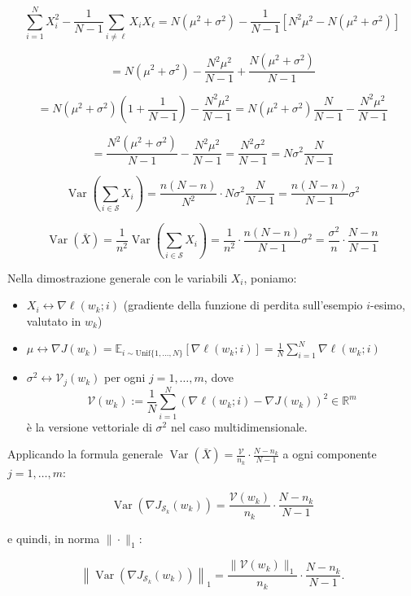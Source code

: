 \documentclass[a4paper,12pt]{article}
\numberwithin{equation}{section}
\numberwithin{figure}{section}
\numberwithin{table}{section}
\begin{document}
\[
\sum_{i=1}^N X_i^2 - \frac{1}{N-1} \sum_{i \neq \ell} X_i X_\ell
= N(\mu^2+\sigma^2) - \frac{1}{N-1}\left[N^2\mu^2 - N(\mu^2+\sigma^2)\right]
\]

\[
= N(\mu^2+\sigma^2) - \frac{N^2\mu^2}{N-1} + \frac{N(\mu^2+\sigma^2)}{N-1}
\]

\[
= N(\mu^2+\sigma^2)\left(1 + \frac{1}{N-1}\right) - \frac{N^2\mu^2}{N-1}
= N(\mu^2+\sigma^2)\frac{N}{N-1} - \frac{N^2\mu^2}{N-1}
\]

\[
= \frac{N^2(\mu^2+\sigma^2)}{N-1} - \frac{N^2\mu^2}{N-1}
= \frac{N^2\sigma^2}{N-1}
= N\sigma^2 \frac{N}{N-1}
\]

\[
\operatorname{Var}\left(\sum_{i \in \mathcal{S}} X_i\right) = 
\frac{n(N-n)}{N^2} \cdot N\sigma^2 \frac{N}{N-1}
= \frac{n(N-n)}{N-1} \sigma^2
\]

\[
\operatorname{Var}(\bar{X}) = \frac{1}{n^2} \operatorname{Var}\left(\sum_{i \in \mathcal{S}} X_i\right) 
= \frac{1}{n^2} \cdot \frac{n(N-n)}{N-1} \sigma^2
= \frac{\sigma^2}{n} \cdot \frac{N-n}{N-1}
\]


\noindent
Nella dimostrazione generale con le variabili $X_i$, poniamo:

\begin{itemize}
    \item $X_i \longleftrightarrow \nabla \ell(w_k; i)$ \quad (gradiente della funzione di perdita sull'esempio $i$-esimo, valutato in $w_k$)
\item $\mu \longleftrightarrow \nabla J(w_k) = \mathbb{E}_{i \sim \mathrm{Unif}\{1,\dots,N\}}\left[\nabla \ell(w_k; i)\right] = \frac{1}{N}\sum_{i=1}^N \nabla \ell(w_k; i)$    \item $\sigma^2 \longleftrightarrow \mathcal{V}_j(w_k)$ per ogni $j=1,\dots,m$, dove
\[
\mathcal{V}(w_k) := \frac{1}{N}\sum_{i=1}^N \left(\nabla \ell(w_k; i) - \nabla J(w_k)\right)^2 \in \mathbb{R}^m
\]
è la versione vettoriale di $\sigma^2$ nel caso multidimensionale.
\end{itemize}

Applicando la formula generale $\operatorname{Var}(\bar{X}) = \frac{\mathcal{V}}{n_k}\cdot\frac{N-n_k}{N-1}$ a ogni componente $j=1,\dots,m$:

\[
 \operatorname{Var} \left(\nabla J_{\mathcal{S}_k}(w_k)\right) = \frac{\mathcal{V}(w_k)}{n_k} \cdot \frac{N-n_k}{N-1}
\]

e quindi, in norma $\|\cdot\|_1$:

\[
\left\|\operatorname{Var}\left(\nabla J_{\mathcal{S}_k}(w_k)\right)\right\|_1 = \frac{\|\mathcal{V}(w_k)\|_1}{n_k} \cdot \frac{N-n_k}{N-1}.
\]
\end{document}
